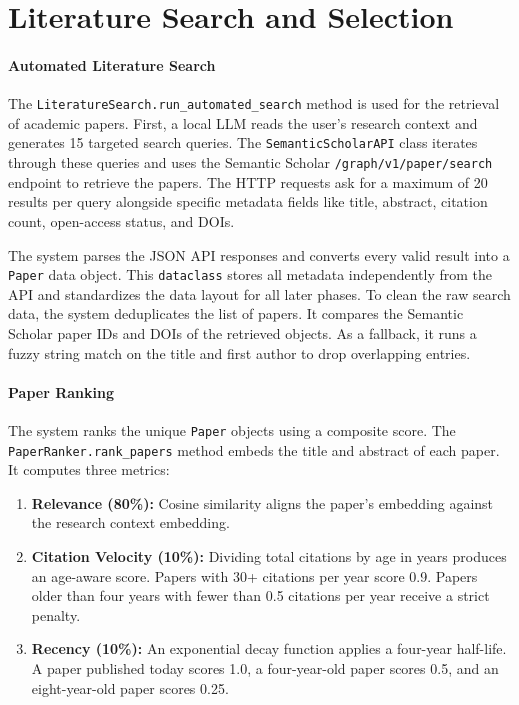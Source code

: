 \section{Literature Search and Selection}

\paragraph{Automated Literature Search}
The \texttt{LiteratureSearch.\allowbreak{}run\_\allowbreak{}automated\_\allowbreak{}search} method is used for the retrieval of academic papers.
First, a local LLM reads the user's research context and generates 15 targeted search queries.
The \texttt{SemanticScholarAPI} class iterates through these queries and uses the Semantic Scholar \texttt{/graph/v1/paper/search} endpoint to retrieve the papers.
The HTTP requests ask for a maximum of 20 results per query alongside specific metadata fields like title, abstract, citation count, open-access status, and DOIs.

The system parses the JSON API responses and converts every valid result into a \texttt{Paper} data object.
This \texttt{dataclass} stores all metadata independently from the API and standardizes the data layout for all later phases.
To clean the raw search data, the system deduplicates the list of papers.
It compares the Semantic Scholar paper IDs and DOIs of the retrieved objects.
As a fallback, it runs a fuzzy string match on the title and first author to drop overlapping entries.

\paragraph{Paper Ranking}
The system ranks the unique \texttt{Paper} objects using a composite score.
The \texttt{PaperRanker.\allowbreak{}rank\_papers} method embeds the title and abstract of each paper.
It computes three metrics:

\begin{enumerate}[nosep]
	\item \textbf{Relevance (80\%):} Cosine similarity aligns the paper's embedding against the research context embedding.
	\item \textbf{Citation Velocity (10\%):} Dividing total citations by age in years produces an age-aware score. Papers with 30+ citations per year score 0.9. Papers older than four years with fewer than 0.5 citations per year receive a strict penalty.
	\item \textbf{Recency (10\%):} An exponential decay function applies a four-year half-life. A paper published today scores 1.0, a four-year-old paper scores 0.5, and an eight-year-old paper scores 0.25.
\end{enumerate}

